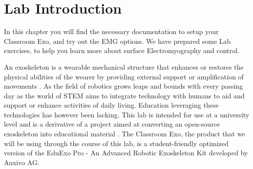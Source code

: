 

\section{Lab Introduction}

\begin{tcolorbox}[colback=blue!5!white,colframe=blue!75!black,title=Summary]
	In this chapter you will find the necessary documentation to setup your Classroom Exo, and try out the EMG options. We have prepared some Lab exercises, to help you learn more about surface Electromyography and control.
\end{tcolorbox}
\vspace{0.5cm}
 
An exoskeleton is a wearable mechanical structure that enhances or restores the physical abilities of the wearer by providing external support or amplification of movements \cite{AlTashi2024}. As the field of robotics grows leaps and bounds with every passing day as the world of STEM aims to integrate technology with humans to aid and support or enhance activities of daily living. Education leveraging these technologies has however been lacking. 
This lab is intended for use at a university level and is a derivative of a project aimed at converting an open-source exoskeleton into educational material \cite{AlTashi2024}. The Classroom Exo, the product that we will be using through the course of this lab, is a student-friendly optimized version of the EduExo Pro - An Advanced Robotic Exoskeleton Kit developed by Auxivo AG. 

